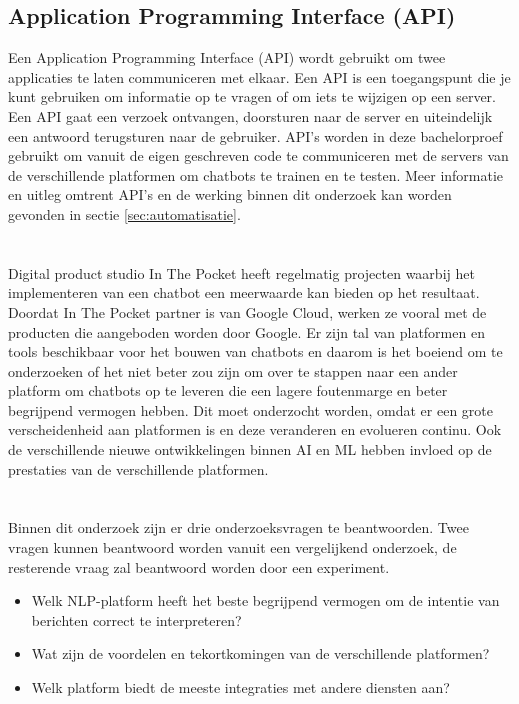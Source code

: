 \subsection{Application Programming Interface (API)}
\label{subsec:begrippen-api}

Een Application Programming Interface (API) wordt gebruikt om twee applicaties te laten communiceren met elkaar. Een API is een toegangspunt die je kunt gebruiken om informatie op te vragen of om iets te wijzigen op een server. Een API gaat een verzoek ontvangen, doorsturen naar de server en uiteindelijk een antwoord terugsturen naar de gebruiker. API’s worden in deze bachelorproef gebruikt om vanuit de eigen geschreven code te communiceren met de servers van de verschillende platformen om chatbots te trainen en te testen. Meer informatie en uitleg omtrent API’s en de werking binnen dit onderzoek kan worden gevonden in sectie \ref{sec:automatisatie}.


\newpage
\section{}
\label{sec:probleemstelling}

Digital product studio In The Pocket heeft regelmatig projecten waarbij het implementeren van een chatbot een meerwaarde kan bieden op het resultaat. Doordat In The Pocket partner is van Google Cloud, werken ze vooral met de producten die aangeboden worden door Google. Er zijn tal van platformen en tools beschikbaar voor het bouwen van chatbots en daarom is het boeiend om te onderzoeken of het niet beter zou zijn om over te stappen naar een ander platform om chatbots op te leveren die een lagere foutenmarge en beter begrijpend vermogen hebben. Dit moet onderzocht worden, omdat er een grote verscheidenheid aan platformen is en deze veranderen en evolueren continu. Ook de verschillende nieuwe ontwikkelingen binnen AI en ML hebben invloed op de prestaties van de verschillende platformen.

\section{}
\label{sec:onderzoeksvraag}

Binnen dit onderzoek zijn er drie onderzoeksvragen te beantwoorden. Twee vragen kunnen beantwoord worden vanuit een vergelijkend onderzoek, de resterende vraag zal beantwoord worden door een experiment.
\begin{itemize}
    \item Welk NLP-platform heeft het beste begrijpend vermogen om de intentie van berichten correct te interpreteren?
    \item Wat zijn de voordelen en tekortkomingen van de verschillende platformen?
    \item Welk platform biedt de meeste integraties met andere diensten aan?
\end{itemize}

